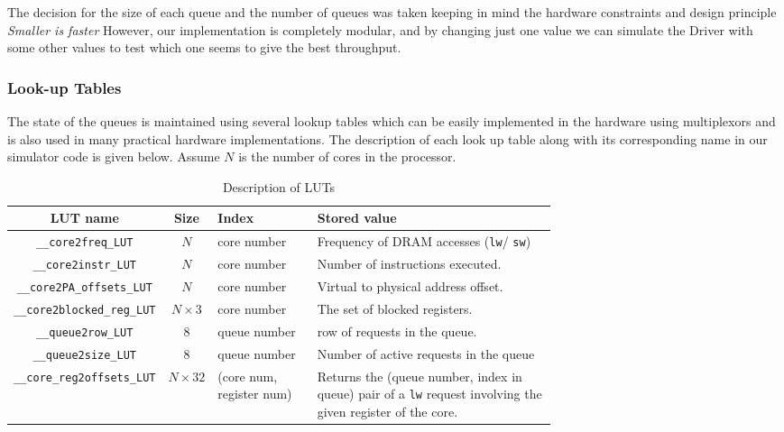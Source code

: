 \documentclass[hidelinks,12pt]{article}
\begin{document}
The decision for the size of each queue and the number of queues was taken keeping in mind the hardware constraints and design principle \textit{Smaller is faster}
However, our implementation is completely modular, and by changing just one value we can simulate the Driver with some other values to
test which one seems to give the best throughput.

\subsubsection{Look-up Tables}

The state of the queues is maintained using several lookup tables which can be easily implemented in the hardware using multiplexors and is also used in many practical hardware implementations.
The description of each look up table along with its corresponding name in our simulator code is given below.
Assume $N$ is the number of cores in the processor.
\begin{table}[H]
    \begin{tabular}[]{|c|c|p{0.2\linewidth}|p{0.5\linewidth}|}
        \hline
        LUT name                & Size          & Index                    & Stored value                                                                                                                   \\  \hline
        \verb|__core2freq_LUT| & $N $          & core number              & Frequency of DRAM accesses (\verb|lw|/ \verb|sw|)                                                  \\ \hline
        \verb|__core2instr_LUT| & $N $          & core number              & Number of instructions executed.                                                                                               \\ \hline
        \verb|__core2PA_offsets_LUT| & $N $          & core number              & Virtual to physical address offset.                                                                                            \\ \hline
        \verb|__core2blocked_reg_LUT| & $N \times 3$  & core number              & The set of blocked registers.                                                                                                  \\ \hline
        \verb|__queue2row_LUT| & $8 $          & queue number             & row of requests in the queue.                                                                                                  \\ \hline
        \verb|__queue2size_LUT| & $8 $          & queue number             & Number of active requests in the queue                                                                                         \\ \hline
        \verb|__core_reg2offsets_LUT| & $N \times 32$ & (core num, register num) & Returns the (queue number, index in queue) pair of a \verb|lw| request involving the given register of the core. \\ \hline
    \end{tabular}
    \caption{Description of LUTs}
\end{table}
\end{document}
